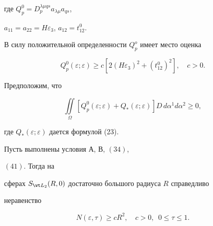 где $Q^0_p=D^{\lambda\mu qs}_p a_{\lambda\mu}a_{qs}$, 


$a_{11}=a_{22}=H\varepsilon_3$, $a_{12}=t^0_{12}$. 


В силу положительной определенности $Q^o_p$ имеет место оценка 


\begin{equation} 


Q^0_p(\varepsilon;\varepsilon)\ge c[2(H\varepsilon_3)^2 


+(t^0_{12})^2],\quad c>0. 


\end{equation} 


Предположим, что 


\begin{equation} 


\iint\limits_\Omega[Q^0_p(\varepsilon;\varepsilon)+Q_* 


(\varepsilon;\varepsilon)]D\,d\alpha^1d\alpha^2\ge 0, 


\end{equation} 


где $Q_*(\varepsilon;\varepsilon)$ дается формулой (23). 


 


\begin{thm} Пусть выполнены условия {\rom А}, {\rom В}, $(34)$, 


$(41)$. Тогда на 


сферах $S_{\wt L_2}(R,0)$ достаточно большого радиуса $R$ справедливо 


неравенство 


$$


N(\varepsilon,\tau)\ge c R^2,\quad c>0,\ \;0\le\tau\le 1. 


$$ 


\end{thm}


 


